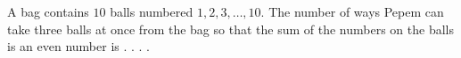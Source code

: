 A bag contains $10$ balls numbered $1,2,3,\ldots,10$. The number of ways Pepem can take three balls at once from the bag so that the sum of the numbers on the balls is an even number is . . . .
